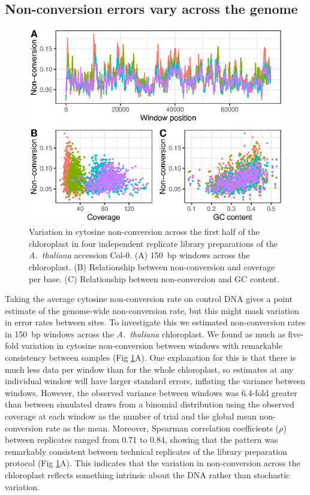 \documentclass[twocolumn,twoside,lettersize]{article}
\begin{document}
\subsection{Non-conversion errors vary across the genome}

\begin{figure}
  \begin{center}
    \includegraphics{figure2.eps}
    \caption{
        Variation in cytosine non-conversion across the first half of the chloroplast in four independent replicate library preparations of the \emph{A.~thaliana} accession Col-0.
        (A) 150~bp windows across the chloroplast.
        (B) Relationship between non-conversion and coverage per base.
        (C) Relationship between non-conversion and GC content.
    }
    \label{fig:uncertainty}
  \end{center}
\end{figure}

Taking the average cytosine non-conversion rate on control DNA gives a point estimate of the genome-wide non-conversion rate, but this might mask variation in error rates between sites.
To investigate this we estimated non-conversion rates in 150~bp windows across the \emph{A.~thaliana} chloroplast.
We found as much as five-fold variation in cytosine non-conversion between windows with remarkable consistency between samples (Fig \ref{fig:uncertainty}A).
One explanation for this is that there is much less data per window than for the whole chloroplast, so estimates at any individual window will have larger standard errors, inflating the variance between windows.
However, the observed variance between windows was 6.4-fold greater than between simulated draws from a binomial distribution using the observed coverage at each window as the number of trial and the global mean non-conversion rate as the mean.
Moreover, Spearman correlation coefficients ($\rho$) between replicates ranged from 0.71 to 0.84, showing that the pattern was remarkably consistent between technical replicates of the library preparation protocol (Fig \ref{fig:uncertainty}A).
This indicates that the variation in non-conversion across the chloroplast reflects something intrinsic about the DNA rather than stochastic variation.
\end{document}
